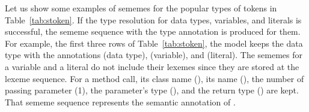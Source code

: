 

Let us show some examples of sememes for the popular types of tokens
in Table~\ref{tab:stoken}. If the type resolution for data types,
variables, and literals is successful, the sememe sequence with the
type annotation is produced for them. For example, the first three
rows of Table~\ref{tab:stoken}, the model keeps the data type with the
annotations  (data type),  (variable), and
 (literal). The sememes for a variable and a literal do not
include their lexemes since they are stored at the lexeme
sequence. For a method call, its class name (), its name
(), the number of passing parameter (1), the parameter's
type (), and the return type () are kept.  That
sememe sequence represents the semantic annotation of .

